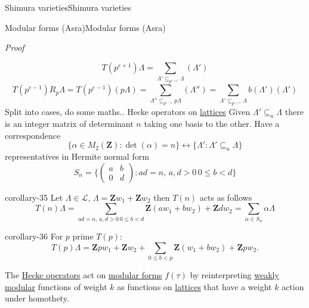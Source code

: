 \documentclass[10pt,]{book}
\makeatletter
\renewcommand*{\proofname}{Proof}
\renewenvironment{proof}[1][\proofname]{\par
  \pushQED{\qed}%
  \normalfont \topsep6\p@\@plus6\p@\relax
  \trivlist
  \item\relax
    {\itshape
    #1\@addpunct{.}}\hspace\labelsep\ignorespaces
}{%
  \popQED\endtrivlist\@endpefalse
}
\numberwithin{equation}{section}
\newcommand{\ZZ}{\mathbf{Z}}
\newcommand{\lt}{<}
\newcommand{\gt}{>}
\newcommand{\amp}{&}
\makeatother
\begin{document}
\begin{chapterptx}{Shimura varieties}{}{Shimura varieties}{}{}
\begin{sectionptx}{Modular forms (Asra)}{}{Modular forms (Asra)}{}{}
\begin{proof}
\begin{equation*}
\end{equation*}
%
\begin{equation*}
T(p^{e+1} ) \Lambda  =  \sum_{\Lambda'\subseteq_{p^{e+1}} \Lambda} (\Lambda')
\end{equation*}
%
\begin{equation*}
T(p^{e-1} )R_p \Lambda  =  T(p^{e-1}) (p \Lambda) = \sum_{\Lambda'' \subseteq_{p^{e-1}} p\Lambda } (\Lambda'') = \sum_{\Lambda' \subseteq_{p^{e+1}} \Lambda} b(\Lambda') (\Lambda')
\end{equation*}
Split into cases, do some maths..%
\end{proof}
\hypertarget{p-1077}{}%
Hecke operators on \hyperref[def-buntes-lattice]{lattices} Given \(\Lambda' \subseteq_n \Lambda\) there is an integer matrix of determinant  \(n\) taking one basis to the other. Have a correspondence%
\begin{equation*}
\{ \alpha \in M_2(\ZZ) : \det(\alpha) = n \}  \leftrightarrow \{ \Lambda ' : \Lambda ' \subseteq_n \Lambda\}
\end{equation*}
representatives in Hermite normal form%
\begin{equation*}
S_n = \{\begin{pmatrix} a\amp b \\ 0 \amp d\end{pmatrix} : ad= n,\, a,d\gt 0\, 0\le b \lt d\}
\end{equation*}
%
\begin{corollary}{}{}{corollary-35}%
\hypertarget{p-1078}{}%
Let \(\Lambda \in \mathcal L\), \(\Lambda = \ZZ w_1 + \ZZ w_2\) then  \(T(n)\) acts as follows%
\begin{equation*}
T(n) \Lambda =  \sum_{ ad= n,\, a,d\gt 0\, 0\le b \lt d} \ZZ(aw_1 + bw_2) + \ZZ dw_2 = \sum_{\alpha \in S_n} \alpha \Lambda
\end{equation*}
%
\end{corollary}
\begin{corollary}{}{}{corollary-36}%
\hypertarget{p-1079}{}%
For \(p \) prime \(T(p)\):%
\begin{equation*}
T(p) \Lambda = \ZZ pw_1 + \ZZ w_2 +\sum_{0 \le b \lt p} \ZZ(w_1 + bw_2) + \ZZ pw_2\text{.}
\end{equation*}
%
\end{corollary}
\hypertarget{p-1080}{}%
The \hyperref[def-buntes-cusp-forms]{Hecke operators} act on \hyperref[def-buntes-mfs]{modular forms} \(f(\tau)\) by reinterpreting \hyperref[def-buntes-weak-modular]{weakly modular} functions of weight \(k\) as functions on \hyperref[def-buntes-lattice]{lattices} that have  a weight \(k\) action under homothety.%

\end{sectionptx}
\end{chapterptx}
\end{document}
